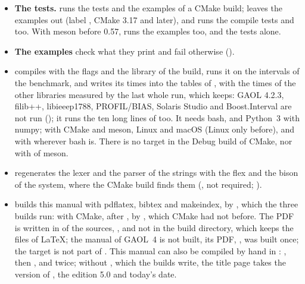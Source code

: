 \begin{itemize}
\item[$\bullet$] \textbf{The tests.}  runs the tests and the
  examples of a CMake build;  leaves the examples out (label
  , CMake 3.17 and later), and runs the compile tests
   and  too. With meson before 0.57,
   runs the examples too, and 
  the tests alone.
\item[$\bullet$] \textbf{The examples} check what they print and fail
  otherwise ().
\item[$\bullet$] \textbf{} compiles
   with the flags and the library of
  the build, runs it on the intervals of the benchmark, and writes its times
  into the tables of , with the times of the
  other libraries measured by the last whole run, which
   keeps: GAOL 4.2.3, filib++,
  libieeep1788, PROFIL/BIAS, Solaris Studio and Boost.Interval are not run
  (); it runs the ten long lines of
   too. It needs bash, and Python~3 with
  numpy; with CMake and meson, Linux and macOS (Linux only before), and with
   wherever bash is. There is no target  in the Debug
  build of CMake, nor with  of meson.\newinvfive
\item[$\bullet$] \textbf{} regenerates the lexer and the
  parser of the strings with the flex and the bison of the system, where the
  CMake build finds them (, not required;
  ).
\item[$\bullet$] \textbf{} builds this manual with pdflatex,
  bibtex and makeindex, by , which the three builds
  run: with CMake, after , by
  , which CMake had not
  before.\newinvfive{} The PDF is written in  of the sources,
  , and not in the build directory, which
  keeps the files of LaTeX; the manual of GAOL~4 is not built, its PDF,
  , was built once; the target is not part
  of . This manual
  can also be compiled by hand in :
  , then ,
   and 
  twice; without , which the builds write, the title
  page takes the version of , the edition 5.0 and today's
  date.
\end{itemize}

